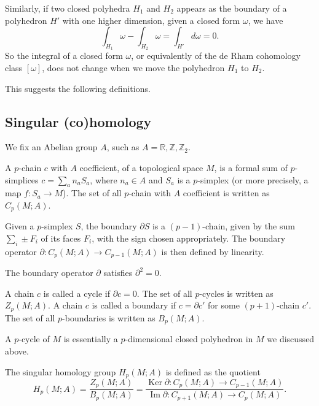 \documentclass[12pt]{article}
\numberwithin{equation}{section}
\numberwithin{figure}{section}
\theoremstyle{remark}
\def\bR{\mathbb{R}}
\def\bZ{\mathbb{Z}}
\def\Ker{\mathop{\mathrm{Ker}}}
\def\Im{\mathop{\mathrm{Im}}}
\begin{document}
Similarly, if two closed polyhedra $H_1$ and $H_2$ appears as the boundary of 
a polyhedron $H'$ with one higher dimension, given a closed form $\omega$, we have \begin{equation}
\int_{H_1} \omega - \int_{H_2} \omega = \int_{H'} d\omega = 0.
\end{equation}
So the integral of a closed form $\omega$, or equivalently of the de Rham cohomology class $[\omega]$,
does not change when we move the polyhedron $H_1$ to $H_2$.

This suggests the following definitions.

\subsection{Singular (co)homology}

We fix an Abelian group $A$, such as $A=\bR, \bZ, \bZ_2$.
\begin{definition}
A $p$-chain $c$ with $A$ coefficient, of a topological space $M$, is a formal sum of $p$-simplices $c=\sum_a n_a S_a$,
where $n_a\in A$ and $S_a$ is a $p$-simplex (or more precisely, a map $f:S_a\to M$).
The set of all $p$-chain with $A$ coefficient is written as $C_p(M;A)$.
\end{definition}

\begin{definition}
Given a $p$-simplex $S$, the boundary $\partial S$ is a $(p-1)$-chain, given by the sum $\sum_i \pm F_i$ of its faces $F_i$, with the sign chosen appropriately.
The boundary operator $\partial:C_p(M;A)\to C_{p-1}(M;A)$ is then defined by linearity.
\end{definition}

\begin{proposition}
The boundary operator $\partial$ satisfies $\partial^2=0$.
\end{proposition}

\begin{definition}
A chain $c$ is called a cycle if $\partial c=0$.
The set of all $p$-cycles is written as $Z_p(M;A)$.
A chain $c$ is called a boundary if $c=\partial c'$ for some $(p+1)$-chain $c'$.
The set of all $p$-boundaries is written as $B_p(M;A)$.
\end{definition}

A $p$-cycle of $M$ is essentially a $p$-dimensional closed polyhedron in $M$ we discussed above. 

\begin{definition}
The singular homology group $H_p(M;A)$ is defined as the quotient \begin{equation}
H_p(M;A) = \frac{Z_p(M;A)}{B_p(M;A)} = \frac{\Ker \partial: C_p(M;A)\to C_{p-1}(M;A)}{\Im \partial: C_{p+1}(M;A)\to C_p(M;A)}.
\end{equation}
\end{definition}
\end{document}
